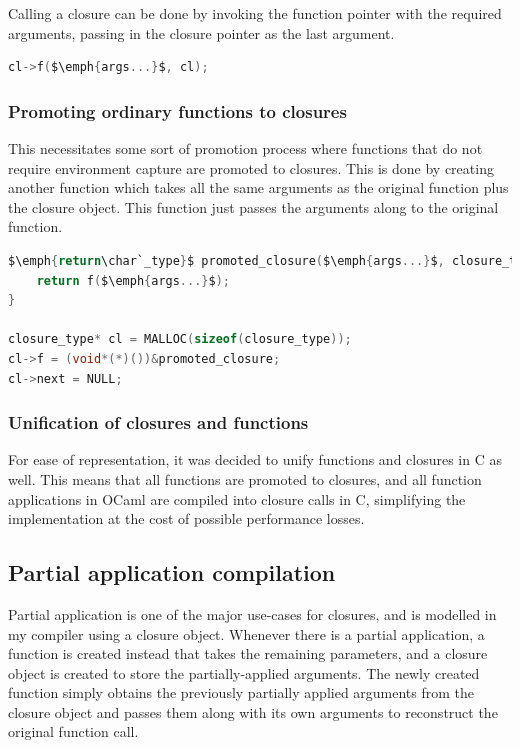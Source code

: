 \documentclass[12pt,a4paper,twoside,openright]{report}
\begin{document}
Calling a closure can be done by invoking the function pointer with the 
required arguments, passing in the closure pointer as the last argument.

\begin{lstlisting}[language=C]
cl->f($\emph{args...}$, cl);
\end{lstlisting}

\subsubsection{Promoting ordinary functions to closures}

This necessitates some sort of promotion process where functions that do not
require environment capture are promoted to closures. This is done by creating
another function which takes all the same arguments as the original function
plus the closure object. This function just passes the arguments along to the
original function.

\begin{lstlisting}[language=C]
$\emph{return\char`_type}$ promoted_closure($\emph{args...}$, closure_type* closure_obj) {
    return f($\emph{args...}$);
}

closure_type* cl = MALLOC(sizeof(closure_type));
cl->f = (void*(*)())&promoted_closure;
cl->next = NULL;
\end{lstlisting}

\subsubsection{Unification of closures and functions}

For ease of representation, it was decided to unify functions and closures in C
as well. This means that all functions are promoted to closures, and all
function applications in OCaml are compiled into closure calls in C, simplifying
the implementation at the cost of possible performance losses.

\subsection{Partial application compilation} \label{partial-app}

Partial application is one of the major use-cases for closures, and is modelled
in my compiler using a closure object. Whenever there is a partial application,
a function is created instead that takes the remaining parameters, and a closure
object is created to store the partially-applied arguments. The newly created
function simply obtains the previously partially applied arguments from the
closure object and passes them along with its own arguments to reconstruct the
original function call.
\end{document}
